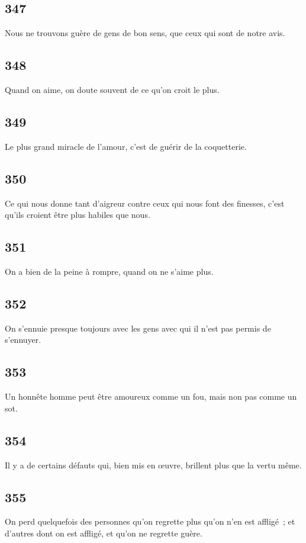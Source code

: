 \documentclass[french,twoside]{book} %
\begin{document}
\subsection[{347}]{ \textsc{347} }
\noindent Nous ne trouvons guère de gens de bon sens, que ceux qui sont de notre avis.
\subsection[{348}]{ \textsc{348} }
\noindent Quand on aime, on doute souvent de ce qu’on croit le plus.
\subsection[{349}]{ \textsc{349} }
\noindent Le plus grand miracle de l’amour, c’est de guérir de la coquetterie.
\subsection[{350}]{ \textsc{350} }
\noindent Ce qui nous donne tant d’aigreur contre ceux qui nous font des finesses, c’est qu’ils croient être plus habiles que nous.
\subsection[{351}]{ \textsc{351} }
\noindent On a bien de la peine à rompre, quand on ne s’aime plus.
\subsection[{352}]{ \textsc{352} }
\noindent On s’ennuie presque toujours avec les gens avec qui il n’est pas permis de s’ennuyer.
\subsection[{353}]{ \textsc{353} }
\noindent Un honnête homme peut être amoureux comme un fou, mais non pas comme un sot.
\subsection[{354}]{ \textsc{354} }
\noindent Il y a de certains défauts qui, bien mis en œuvre, brillent plus que la vertu même.
\subsection[{355}]{ \textsc{355} }
\noindent On perd quelquefois des personnes qu’on regrette plus qu’on n’en est affligé ; et d’autres dont on est affligé, et qu’on ne regrette guère.
\end{document}
